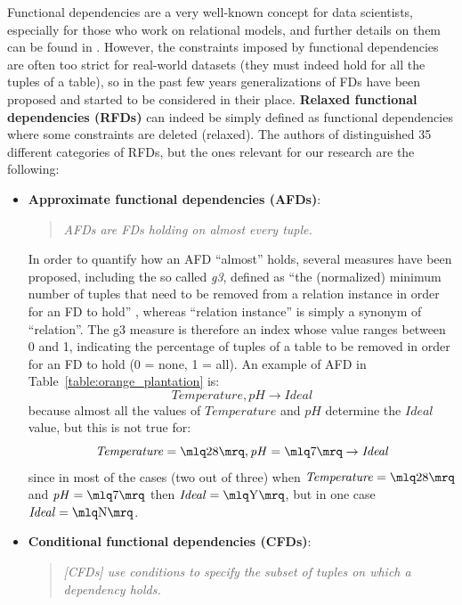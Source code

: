 Functional dependencies are a very well-known concept for data scientists, especially for those who work on relational models, and further details on them can be found in \cite{abiteboul1995foundations}.
However, the constraints imposed by functional dependencies are often too strict for real-world datasets (they must indeed hold for all the tuples of a table), so in the past few years generalizations of FDs have been proposed and started to be considered in their place. \textbf{Relaxed functional dependencies (RFDs)} can indeed be simply defined as functional dependencies where some constraints are deleted (relaxed). The authors of \cite{caruccio2015relaxed} distinguished 35 different categories of RFDs, but the ones relevant for our research are the following:
\begin{itemize}
\item \textbf{Approximate functional dependencies (AFDs)}:
\begin{quote}\emph{AFDs are FDs holding on almost every tuple.} \cite[p.~151]{caruccio2015relaxed}\end{quote}
In order to quantify how an AFD ``almost'' holds, several measures have been proposed, including the so called \textit{g3}, defined as ``the (normalized) minimum number of tuples that need to be removed from a relation instance in order for an FD to hold'' \cite[p.~151]{caruccio2015relaxed}, whereas ``relation instance'' is simply a synonym of ``relation''. The g3 measure is therefore an index whose value ranges between 0 and 1, indicating the percentage of tuples of a table to be removed in order for an FD to hold (0 = none, 1 = all). An example of AFD in Table~\ref{table:orange_plantation} is: \[\mathit{Temperature}, \mathit{pH} \rightarrow \mathit{Ideal}\] because almost all the values of \(\mathit{Temperature}\) and \(\mathit{pH}\) determine the \(\mathit{Ideal}\) value, but this is not true for: \[\mathit{Temperature} = \mlq 28 \mrq, \mathit{pH} = \mlq 7 \mrq \rightarrow \mathit{Ideal}\] since in most of the cases (two out of three) when \(\mathit{Temperature} = \mlq 28 \mrq\) and \(\mathit{pH} = \mlq 7 \mrq\) then \(\mathit{Ideal} = \mlq \mathrm{Y} \mrq\), but in one case \(\mathit{Ideal} = \mlq \mathrm{N} \mrq\).
\item \textbf{Conditional functional dependencies (CFDs)}:
\begin{quote}\emph{\emph{[CFDs]} use conditions to specify the subset of tuples on which a dependency holds.} \cite[p.~152]{caruccio2015relaxed}\end{quote}

\end{itemize}
